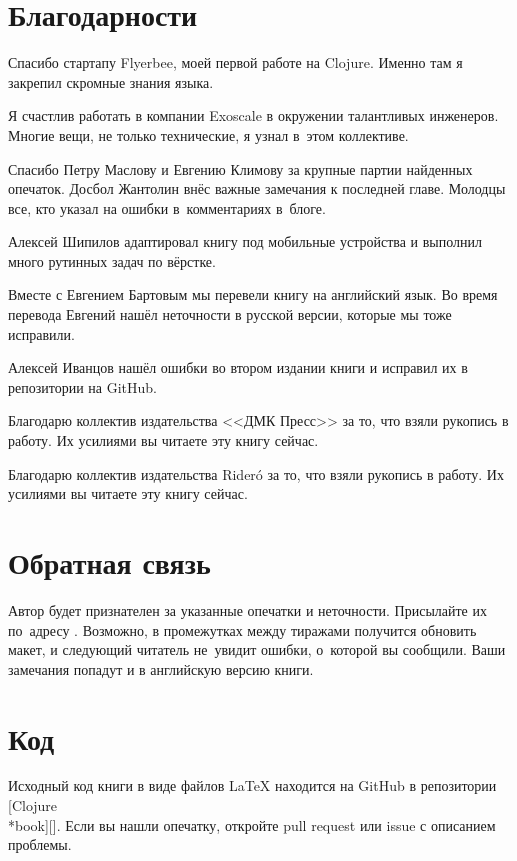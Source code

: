 \section*{Благодарности}

Спасибо стартапу Flyerbee, моей первой работе на Clojure. Именно там я закрепил
скромные знания языка.

Я счастлив работать в компании Exoscale в окружении талантливых
инженеров. Многие вещи, не только технические, я узнал в~этом коллективе.

Спасибо Петру Маслову и Евгению Климову за крупные партии найденных
опечаток. Досбол Жантолин внёс важные замечания к последней главе. Молодцы все,
кто указал на ошибки в~комментариях в~блоге.

Алексей Шипилов адаптировал книгу под мобильные устройства и выполнил много
рутинных задач по вёрстке.

Вместе с Евгением Бартовым мы перевели книгу на английский язык. Во время
перевода Евгений нашёл неточности в русской версии, которые мы тоже исправили.

Алексей Иванцов нашёл ошибки во втором издании книги и исправил их в репозитории
на GitHub.

\ifdmk
Благодарю коллектив издательства <<ДМК Пресс>> за то, что взяли рукопись в
работу. Их усилиями вы читаете эту книгу сейчас.
\fi

\ifridero
Благодарю коллектив издательства Rider\'{o} за то, что взяли рукопись в
работу. Их усилиями вы читаете эту книгу сейчас.
\fi

\section*{Обратная связь}

Автор будет признателен за указанные опечатки и неточности. Присылайте их
по~адресу \EMAILLINK. Возможно, в промежутках между тиражами получится обновить
макет, и следующий читатель не~увидит ошибки, о~которой вы сообщили. Ваши
замечания попадут и в английскую версию книги.

\section*{Код}

\iflarge
\setlength{\marginparoffset}{-10mm}
\fi

Исходный код книги в виде файлов \LaTeX{} находится на GitHub в репозитории
[Clojure\\*book][\marginparoffset]. Если
вы нашли опечатку, откройте pull request или issue с описанием проблемы.

